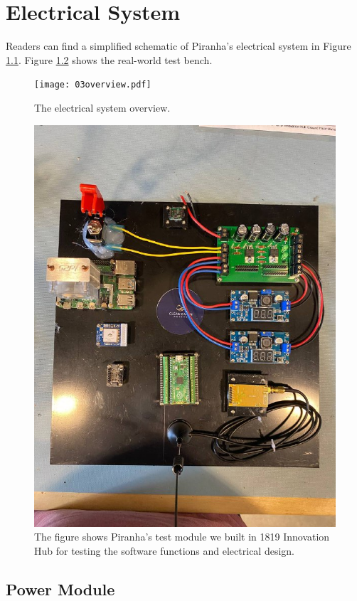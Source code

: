 \chapter{Electrical System}

Readers can find a simplified schematic of Piranha's electrical system in Figure \ref{fig:03overview}. Figure \ref{fig:03test-bench} shows the real-world test bench. 

\begin{figure}[H]
    \centering
    \texttt{[image: 03overview.pdf]}
    \caption{The electrical system overview.}
    \label{fig:03overview}
\end{figure}

\begin{figure}[H]
    \centering
    \includegraphics[width=.8\textwidth]{images/03test-bench.jpeg}
    \caption{The figure shows Piranha's test module we built in 1819 Innovation Hub for testing the software functions and electrical design.}
    \label{fig:03test-bench}
\end{figure}

\section{Power Module}

